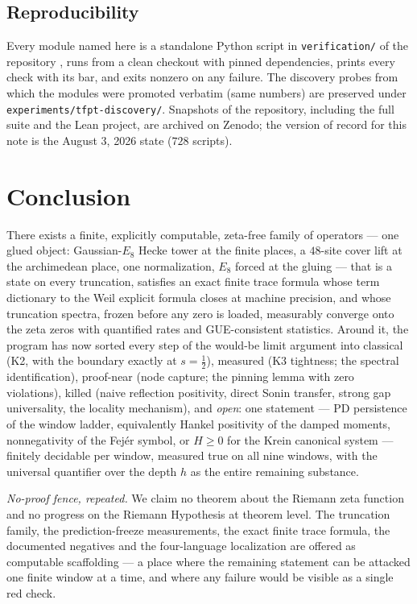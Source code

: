 \documentclass[11pt,a4paper]{article}
\theoremstyle{remark}
\begin{document}
\subsection{Reproducibility}
Every module named here is a standalone Python script in
\texttt{verification/} of the repository \cite{TFPT}, runs from a
clean checkout with pinned dependencies, prints every check with its
bar, and exits nonzero on any failure.  The discovery probes from
which the modules were promoted verbatim (same numbers) are preserved
under \texttt{experiments/tfpt-discovery/}.  Snapshots of the
repository, including the full suite and the Lean project, are
archived on Zenodo; the version of record for this note is the
August 3, 2026 state ($728$ scripts).

\section{Conclusion}\label{sec:conclusion}

There exists a finite, explicitly computable, zeta-free family of
operators --- one glued object: Gaussian-$E_8$ Hecke tower at the
finite places, a $48$-site cover lift at the archimedean place, one
normalization, $E_8$ forced at the gluing --- that is a state on
every truncation, satisfies an exact finite trace formula whose term
dictionary to the Weil explicit formula closes at machine precision,
and whose truncation spectra, frozen before any zero is loaded,
measurably converge onto the zeta zeros with quantified rates and
GUE-consistent statistics.  Around it, the program has now sorted
every step of the would-be limit argument into classical
(K2, with the boundary exactly at $s=\tfrac12$), measured (K3
tightness; the spectral identification), proof-near (node capture;
the pinning lemma with zero violations), killed (naive reflection
positivity, direct Sonin transfer, strong gap universality, the
locality mechanism), and \emph{open}: one statement --- PD
persistence of the window ladder, equivalently Hankel positivity of
the damped moments, nonnegativity of the Fej\'er symbol, or
$H\ge0$ for the Krein canonical system --- finitely decidable per
window, measured true on all nine windows, with the universal
quantifier over the depth $h$ as the entire remaining substance.

\emph{No-proof fence, repeated.}  We claim no theorem about the
Riemann zeta function and no progress on the Riemann Hypothesis at
theorem level.  The truncation family, the prediction-freeze
measurements, the exact finite trace formula, the documented
negatives and the four-language localization are offered as
computable scaffolding --- a place where the remaining statement can
be attacked one finite window at a time, and where any failure would
be visible as a single red check.
\end{document}
